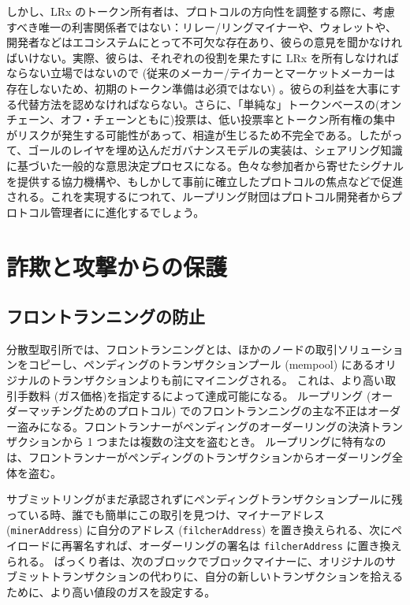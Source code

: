 \documentclass{article}
\begin{document}
\begin{multicols}{2}
しかし、LRx のトークン所有者は、プロトコルの方向性を調整する際に、考慮すべき唯一の利害関係者ではない：リレー/リングマイナーや、ウォレットや、開発者などはエコシステムにとって不可欠な存在あり、彼らの意見を聞かなければいけない。実際、彼らは、それぞれの役割を果たすに LRx を所有しなければならない立場ではないので (従来のメーカー/テイカーとマーケットメーカーは存在しないため、初期のトークン準備は必須ではない) 。彼らの利益を大事にする代替方法を認めなければならない。さらに、「単純な」トークンベースの(オンチェーン、オフ・チェーンともに)投票は、低い投票率とトークン所有権の集中がリスクが発生する可能性があって、相違が生じるため不完全である。したがって、ゴールのレイヤを埋め込んだガバナンスモデルの実装は、シェアリング知識に基づいた一般的な意思決定プロセスになる。色々な参加者から寄せたシグナルを提供する協力機構や、もしかして事前に確立したプロトコルの焦点などで促進される。これを実現するにつれて、ループリング財団はプロトコル開発者からプロトコル管理者にに進化するでしょう。

\section{詐欺と攻撃からの保護}
\subsection{フロントランニングの防止\label{sec:dual_authoring}}

分散型取引所では、フロントランニングとは、ほかのノードの取引ソリューションをコピーし、ペンディングのトランザクションプール (mempool) にあるオリジナルのトランザクションよりも前にマイニングされる。 これは、より高い取引手数料 (ガス価格)を指定するによって達成可能になる。 ループリング (オーダーマッチングためのプロトコル) でのフロントランニングの主な不正はオーダー盗みになる。フロントランナーがペンディングのオーダーリングの決済トランザクションから 1 つまたは複数の注文を盗むとき。 ループリングに特有なのは、フロントランナーがペンディングのトランザクションからオーダーリング全体を盗む。

サブミットリングがまだ承認されずにペンディングトランザクションプールに残っている時、誰でも簡単にこの取引を見つけ、マイナーアドレス (\verb|minerAddress|) に自分のアドレス (\verb|filcherAddress|) を置き換えられる、次にペイロードに再署名すれば、オーダーリングの署名は \verb|filcherAddress| に置き換えられる。
ぱっくり者は、次のブロックでブロックマイナーに、オリジナルのサブミットトランザクションの代わりに、自分の新しいトランザクションを拾えるために、より高い値段のガスを設定する。


\end{multicols}
\end{document}
